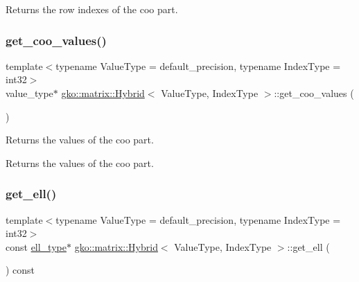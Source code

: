 \begin{DoxyReturn}{Returns}
the row indexes of the coo part. 
\end{DoxyReturn}
\mbox{\label{classgko_1_1matrix_1_1Hybrid_a8513b46a3abb728b725fc26af81d09b9}} 
\subsubsection{\texorpdfstring{get\+\_\+coo\+\_\+values()}{get\_coo\_values()}}
{\footnotesize\ttfamily template$<$typename Value\+Type = default\+\_\+precision, typename Index\+Type = int32$>$ \\
value\+\_\+type$\ast$ \hyperlink{classgko_1_1matrix_1_1Hybrid}{gko\+::matrix\+::\+Hybrid}$<$ Value\+Type, Index\+Type $>$\+::get\+\_\+coo\+\_\+values (\begin{DoxyParamCaption}{ }\end{DoxyParamCaption})\hspace{0.3cm}{\ttfamily [noexcept]}}



Returns the values of the coo part. 

\begin{DoxyReturn}{Returns}
the values of the coo part. 
\end{DoxyReturn}
\mbox{\label{classgko_1_1matrix_1_1Hybrid_afe9a3a9a801271d5ead4774fff7ffbd7}} 
\subsubsection{\texorpdfstring{get\+\_\+ell()}{get\_ell()}}
{\footnotesize\ttfamily template$<$typename Value\+Type = default\+\_\+precision, typename Index\+Type = int32$>$ \\
const \hyperlink{classgko_1_1matrix_1_1Ell}{ell\+\_\+type}$\ast$ \hyperlink{classgko_1_1matrix_1_1Hybrid}{gko\+::matrix\+::\+Hybrid}$<$ Value\+Type, Index\+Type $>$\+::get\+\_\+ell (\begin{DoxyParamCaption}{ }\end{DoxyParamCaption}) const\hspace{0.3cm}{\ttfamily [noexcept]}}



